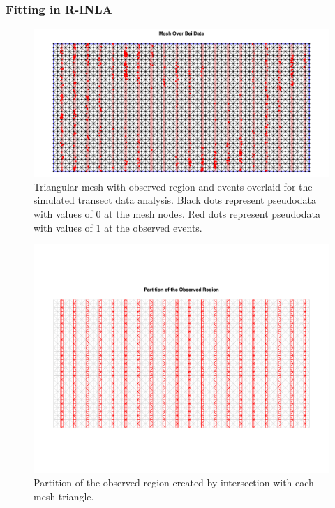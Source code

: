 \documentclass{interact}
\begin{document}
\subsubsection{Fitting in R-INLA}
\label{xsectfitting}

\begin{figure}[p!]
\includegraphics[width=\textwidth]{figures/bei-effort_mesh.pdf}
\caption{Triangular mesh with observed region and events overlaid for the
simulated transect data analysis. Black dots represent pseudodata with values
of 0 at the mesh nodes. Red dots represent pseudodata with values of 1 at the
observed events.}
\label{effortmesh}
\end{figure}

\begin{figure}[p!]
\includegraphics[width=\textwidth]{figures/bei-effort_partition.pdf}
\caption{Partition of the observed region created by intersection with each
mesh triangle.}
\label{effortpartition}
\end{figure}
\end{document}
